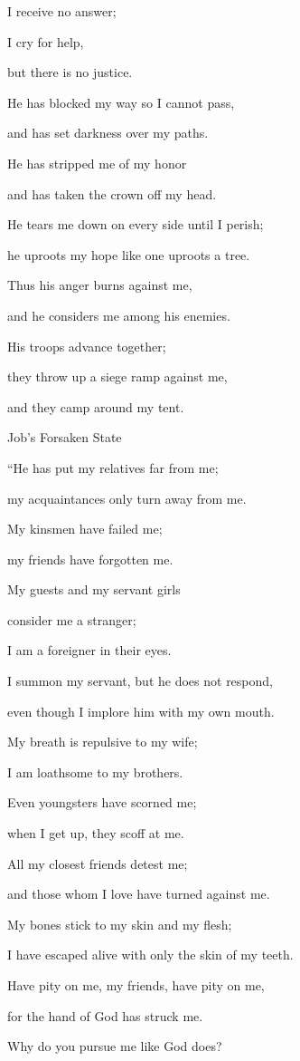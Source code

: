 {\par }{\Q I receive no
answer;
\par }{\Q I cry for help,
\par }{\Q but there is no
justice.
\par }{\Q {}He has blocked
my way
so I cannot
pass,
\par }{\Q and has set
darkness
over
my paths.
\par }{\Q {}He has stripped
me of my honor
\par }{\Q and has taken the crown
off
my head.
\par }{\Q {}He tears
me down
on every side
until I perish;
\par }{\Q he uproots
my hope
like one uproots a tree.
\par }{\Q {}Thus his anger
burns
against
me,
\par }{\Q and he considers
me among his enemies.
\par }{\Q {}His troops
advance
together;
\par }{\Q they throw up
a siege ramp
against
me,
\par }{\Q and they camp
around
my tent.
\par }{\SH Job’s Forsaken State
\par }{\Q {}“He has put my relatives
far
from me;
\par }{\Q my acquaintances
only
turn away from me.
\par }{\Q {}My kinsmen
have failed
me;
\par }{\Q my friends
have forgotten me.
\par }{\Q {}My guests
and my servant girls
\par }{\Q consider
me a stranger;
\par }{\Q I am a foreigner
in their eyes.
\par }{\Q {}I summon
my servant,
but he does not
respond,
\par }{\Q even though I implore
him with my own mouth.
\par }{\Q {}My breath
is repulsive
to my wife;
\par }{\Q I am loathsome
to my brothers.
\par }{\Q {}Even
youngsters
have scorned
me;
\par }{\Q when I
get
up, they scoff at me.
\par }{\Q {}All
my closest
friends detest
me;
\par }{\Q and those whom I love
have turned against me.
\par }{\Q {}My bones
stick
to my skin
and my flesh;
\par }{\Q I have escaped
alive with only the skin
of my teeth.
\par }{\Q {}Have pity
on me, my friends,
have pity on me,
\par }{\Q for
the hand
of God
has struck me.
\par }{\Q {}Why
do you pursue
me like
God
does?

}
